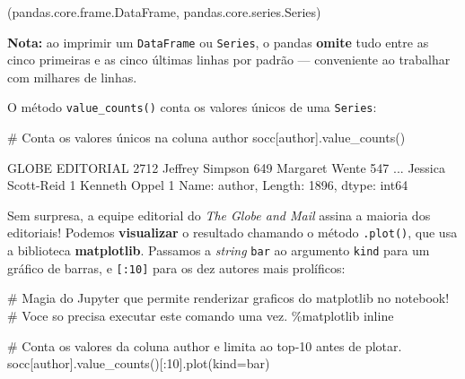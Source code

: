 \documentclass[
  brazilian,
  11pt,
]{article}
\newenvironment{Shaded}{\begin{snugshade}}{\end{snugshade}}
\newcommand{\CommentTok}[1]{\textcolor[rgb]{0.48,0.49,0.49}{#1}}
\newcommand{\DecValTok}[1]{\textcolor[rgb]{0.96,0.45,0.00}{#1}}
\newcommand{\NormalTok}[1]{\textcolor[rgb]{0.81,0.81,0.76}{#1}}
\newcommand{\OperatorTok}[1]{\textcolor[rgb]{0.81,0.81,0.76}{#1}}
\newcommand{\StringTok}[1]{\textcolor[rgb]{0.96,0.31,0.31}{#1}}
\let\oldtexttt\texttt
\renewcommand{\texttt}[1]{{\color{inlink}\oldtexttt{#1}}}
\begin{document}
\begin{Shaded}
\begin{Highlighting}[]
\NormalTok{(pandas.core.frame.DataFrame, pandas.core.series.Series)}
\end{Highlighting}
\end{Shaded}

\begin{notebox}

\textbf{Nota:} ao imprimir um \texttt{DataFrame} ou \texttt{Series}, o
pandas \textbf{omite} tudo entre as cinco primeiras e as cinco últimas
linhas por padrão --- conveniente ao trabalhar com milhares de linhas.

\end{notebox}

O método \texttt{value\_counts()} conta os valores únicos de uma
\texttt{Series}:

\begin{Shaded}
\begin{Highlighting}[]
\CommentTok{\# Conta os valores únicos na coluna \textquotesingle{}author\textquotesingle{}}
\NormalTok{socc[}\StringTok{\textquotesingle{}author\textquotesingle{}}\NormalTok{].value\_counts()}
\end{Highlighting}
\end{Shaded}

\begin{Shaded}
\begin{Highlighting}[]
\NormalTok{GLOBE EDITORIAL                   2712}
\NormalTok{Jeffrey Simpson                    649}
\NormalTok{Margaret Wente                     547}
\NormalTok{                                  ...}
\NormalTok{Jessica Scott{-}Reid                   1}
\NormalTok{Kenneth Oppel                        1}
\NormalTok{Name: author, Length: 1896, dtype: int64}
\end{Highlighting}
\end{Shaded}

Sem surpresa, a equipe editorial do \emph{The Globe and Mail} assina a
maioria dos editoriais! Podemos \textbf{visualizar} o resultado chamando
o método \texttt{.plot()}, que usa a biblioteca \textbf{matplotlib}.
Passamos a \emph{string} \texttt{bar} ao argumento \texttt{kind} para um
gráfico de barras, e \texttt{{[}:10{]}} para os dez autores mais
prolíficos:

\begin{Shaded}
\begin{Highlighting}[]
\CommentTok{\# Magia do Jupyter que permite renderizar graficos do matplotlib no notebook!}
\CommentTok{\# Voce so precisa executar este comando uma vez.}
\OperatorTok{\%}\NormalTok{matplotlib inline}

\CommentTok{\# Conta os valores da coluna \textquotesingle{}author\textquotesingle{} e limita ao top{-}10 antes de plotar.}
\NormalTok{socc[}\StringTok{\textquotesingle{}author\textquotesingle{}}\NormalTok{].value\_counts()[:}\DecValTok{10}\NormalTok{].plot(kind}\OperatorTok{=}\StringTok{\textquotesingle{}bar\textquotesingle{}}\NormalTok{)}
\end{Highlighting}
\end{Shaded}
\end{document}
